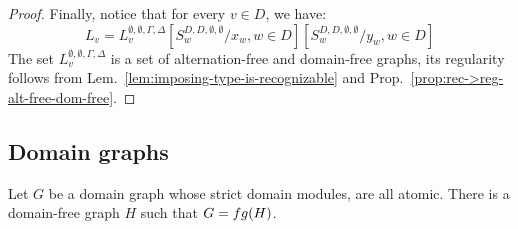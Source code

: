 \begin{proof}
\noindent Finally, notice that for every $v\in D$, we have:
$$ L_v=L^{\emptyset,\emptyset,\Gamma,\Delta}_v[S^{D,D,\emptyset,\emptyset}_w/x_w, w\in D] [S^{D,D,\emptyset,\emptyset}_w/y_w, w\in D]$$
The set $L^{\emptyset,\emptyset,\Gamma,\Delta}_v$ is a set of alternation-free and domain-free graphs, its regularity follows from Lem.~\ref{lem:imposing-type-is-recognizable} and Prop.~\ref{prop:rec->reg-alt-free-dom-free}.
\end{proof}

\subsection{Domain graphs}

\begin{lemma}\label{lem:domain-modules-atomic->domain-free}
Let $G$ be a domain graph whose strict domain modules, are all atomic. There is a domain-free graph $H$ such that $G=\dom(H)$.   
\end{lemma}




